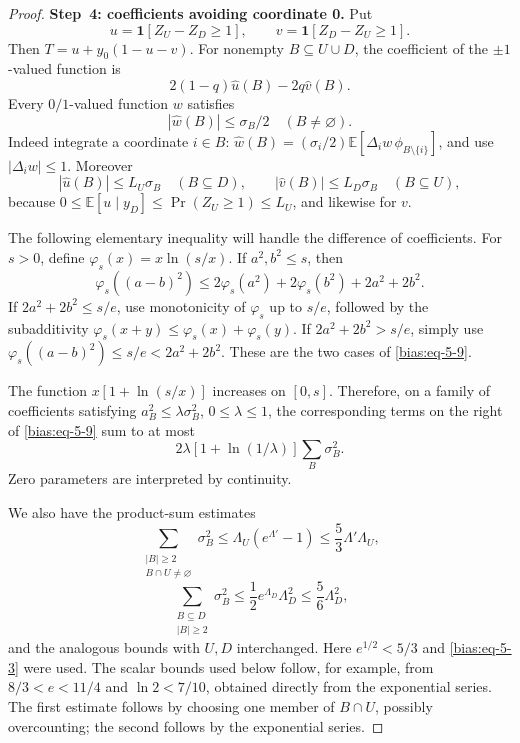 \documentclass[11pt]{amsart}
\theoremstyle{definition}
\theoremstyle{remark}
\begin{document}
\begin{proof}
\textbf{Step~4: coefficients avoiding coordinate 0.} Put \[
 u=\mathbf1[Z_U-Z_D\ge1],\qquad
 v=\mathbf1[Z_D-Z_U\ge1].
\] Then \(T=u+y_0(1-u-v)\). For nonempty \(B\subseteq U\cup D\), the coefficient of the \(\pm1\)-valued function is \[
 2(1-q)\widehat u(B)-2q\widehat v(B).
\] Every \(0/1\)-valued function \(w\) satisfies \begin{equation}\label{bias:eq-5-7}
|\widehat w(B)|\le\sigma_B/2\quad(B\ne\varnothing).
\end{equation} Indeed integrate a coordinate \(i\in B\): \(\widehat w(B)=(\sigma_i/2)\mathbb E[\Delta_iw\,\phi_{B\setminus\{i\}}]\), and use \(|\Delta_iw|\le1\). Moreover \begin{equation}\label{bias:eq-5-8}
|\widehat u(B)|\le L_U\sigma_B\quad(B\subseteq D),\qquad
 |\widehat v(B)|\le L_D\sigma_B\quad(B\subseteq U),
\end{equation} because \(0\le\mathbb E[u\mid y_D]\le\Pr(Z_U\ge1)\le L_U\), and likewise for \(v\).

The following elementary inequality will handle the difference of coefficients. For \(s>0\), define \(\varphi_s(x)=x\ln(s/x)\). If \(a^2,b^2\le s\), then \begin{equation}\label{bias:eq-5-9}
\varphi_s((a-b)^2)
 \le2\varphi_s(a^2)+2\varphi_s(b^2)+2a^2+2b^2.
\end{equation} If \(2a^2+2b^2\le s/e\), use monotonicity of \(\varphi_s\) up to \(s/e\), followed by the subadditivity \(\varphi_s(x+y)\le\varphi_s(x)+\varphi_s(y)\). If \(2a^2+2b^2>s/e\), simply use \(\varphi_s((a-b)^2)\le s/e<2a^2+2b^2\). These are the two cases of \eqref{bias:eq-5-9}.

The function \(x[1+\ln(s/x)]\) increases on \([0,s]\). Therefore, on a family of coefficients satisfying \(a_B^2\le\lambda\sigma_B^2\), \(0\le\lambda\le1\), the corresponding terms on the right of \eqref{bias:eq-5-9} sum to at most \begin{equation}\label{bias:eq-5-10}
2\lambda[1+\ln(1/\lambda)]
       \sum_B\sigma_B^2.
\end{equation} Zero parameters are interpreted by continuity.

We also have the product-sum estimates \begin{equation}\label{bias:eq-5-11}
\sum_{\substack{|B|\ge2\\B\cap U\ne\varnothing}}\sigma_B^2
 \le\Lambda_U(e^{\Lambda'}-1)
 \le\frac53\Lambda'\Lambda_U,
\end{equation} \begin{equation}\label{bias:eq-5-12}
\sum_{\substack{B\subseteq D\\|B|\ge2}}\sigma_B^2
 \le\frac12 e^{\Lambda_D}\Lambda_D^2
 \le\frac56\Lambda_D^2,
\end{equation} and the analogous bounds with \(U,D\) interchanged. Here \(e^{1/2}<5/3\) and \eqref{bias:eq-5-3} were used. The scalar bounds used below follow, for example, from \(8/3<e<11/4\) and \(\ln2<7/10\), obtained directly from the exponential series. The first estimate follows by choosing one member of \(B\cap U\), possibly overcounting; the second follows by the exponential series.


\end{proof}
\end{document}
